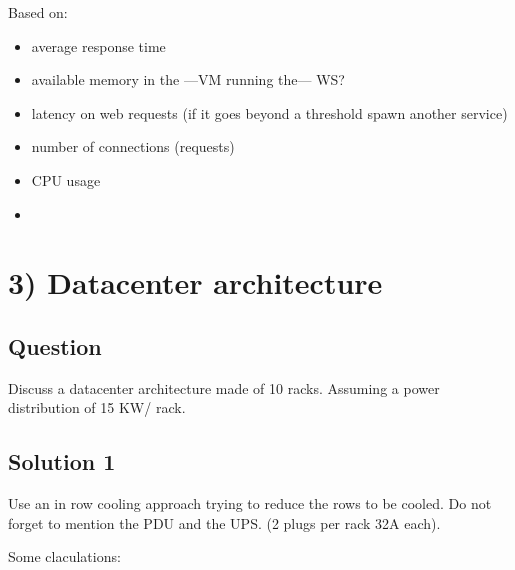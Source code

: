 Based on:

\begin{itemize}
\item
  average response time
\item
  available memory in the ---VM running the--- WS? 
\item
  latency on web requests (if it goes beyond a threshold spawn another service)
\item
  number of connections (requests)
\item
  CPU usage

\item {}
\end{itemize}

\hypertarget{datacenter-architecture}{%
\section{3) Datacenter architecture}\label{datacenter-architecture}}

\hypertarget{question-2}{%
\subsection{Question}\label{question-2}}

Discuss a datacenter architecture made of 10 racks. Assuming a power
distribution of 15 KW/ rack.

\hypertarget{solution-2}{%
\subsection{Solution 1}\label{solution-2}}

Use an in row cooling approach trying to reduce the rows to be cooled.
Do not forget to mention the PDU and the UPS. (2 plugs per rack 32A
each).

Some claculations:

